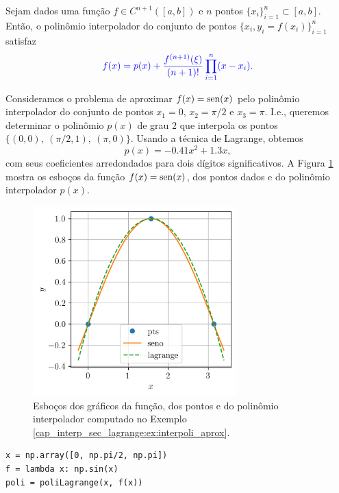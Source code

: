 \begin{teo}\label{cap_interp_sec_lagrange:teo:lagrange}
  Sejam dados uma função $f\in C^{n+1}([a, b])$ e $n$ pontos $\{x_i\}_{i=1}^n\subset [a, b]$. Então, o polinômio interpolador do conjunto de pontos $\{x_i, y_i=f(x_i)\}_{i=1}^n$ satisfaz
  \begin{equation}\color{blue}f(x) = p(x) + \frac{f^{(n+1)}(\xi)}{(n+1)!}\prod_{i=1}^n(x-x_i).
  \end{equation}
\end{teo}

\begin{ex}\label{cap_interp_sec_lagrange:ex:interpoli_aprox}
  Consideramos o problema de aproximar $f(x) = \operatorname{sen}(x)$ pelo polinômio interpolador do conjunto de pontos $x_1=0$, $x_2=\pi/2$ e $x_3=\pi$. I.e., queremos determinar o polinômio $p(x)$ de grau $2$ que interpola os pontos $\{(0, 0),~(\pi/2, 1),~(\pi, 0)\}$. Usando a técnica de Lagrange, obtemos
  \begin{equation}
    p(x) = -0.41x^2 + 1.3x,
  \end{equation}
com seus coeficientes arredondados para dois dígitos significativos. A Figura \ref{cap_interp_sec_lagrange:fig:interpoli_aprox} mostra os esboços da função $f(x)=\operatorname{sen}(x)$, dos pontos dados e do polinômio interpolador $p(x)$.

\begin{figure}[H]
  \centering
  \includegraphics[width=0.7\textwidth]{./cap_interp/dados/fig_poliLagrange/fig}
  \caption{Esboços dos gráficos da função, dos pontos e do polinômio interpolador computado no Exemplo \ref{cap_interp_sec_lagrange:ex:interpoli_aprox}.}
  \label{cap_interp_sec_lagrange:fig:interpoli_aprox}
\end{figure}

\begin{lstlisting}
x = np.array([0, np.pi/2, np.pi])
f = lambda x: np.sin(x)
poli = poliLagrange(x, f(x))
\end{lstlisting}

\end{ex}

